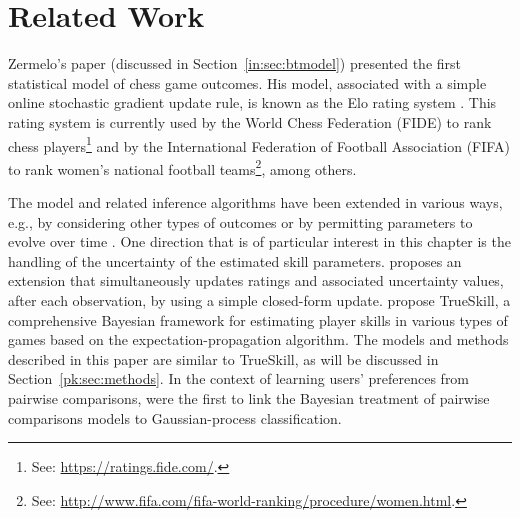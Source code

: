 \section{Related Work}
\label{pk:sec:relwork}

Zermelo's \citeyear{zermelo1928berechnung} paper (discussed in Section~\ref{in:sec:btmodel}) presented the first statistical model of chess game outcomes.
His model, associated with a simple online stochastic gradient update rule, is known as the Elo rating system \citep{elo1978rating}.
This rating system is currently used by the World Chess Federation (FIDE) to rank chess players\footnote{See: \url{https://ratings.fide.com/}.} and by the International Federation of Football Association (FIFA) to rank women's national football teams\footnote{See: \url{http://www.fifa.com/fifa-world-ranking/procedure/women.html}.}, among others.

The model and related inference algorithms have been extended in various ways, e.g., by considering other types of outcomes \citep{rao1967ties, maher1982modelling} or by permitting parameters to evolve over time \citep{glickman1993paired, fahrmeir1994dynamic, cattelan2013dynamic}.
One direction that is of particular interest in this chapter is the handling of the uncertainty of the estimated skill parameters.
\citet{glickman1999parameter} proposes an extension that simultaneously updates ratings and associated uncertainty values, after each observation, by using a simple closed-form update.
\citet{herbrich2006trueskill} propose TrueSkill, a comprehensive Bayesian framework for estimating player skills in various types of games based on the expectation-propagation algorithm.
The models and methods described in this paper are similar to TrueSkill, as will be discussed in Section~\ref{pk:sec:methods}.
In the context of learning users' preferences from pairwise comparisons, \citet{chu2005preference} were the first to link the Bayesian treatment of pairwise comparisons models to Gaussian-process classification.
